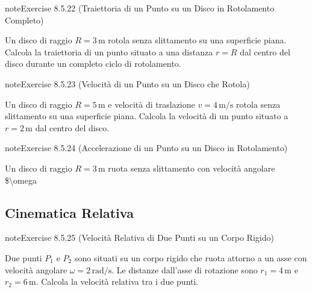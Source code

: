 \documentclass[letterpaper,10pt,italian]{jupyterBook}
\begin{document}
\begin{sphinxadmonition}{note}{Exercise 8.5.22 (Traiettoria di un Punto su un Disco in Rotolamento Completo)}



\sphinxAtStartPar
Un disco di raggio \(R = 3 \, \text{m}\) rotola senza slittamento su una superficie piana. Calcola la traiettoria di un punto situato a una distanza \(r = R\) dal centro del disco durante un completo ciclo di rotolamento.
\end{sphinxadmonition}
 \label{exercise:ch/mechanics/kinematics-problems-exercise-22}

\begin{sphinxadmonition}{note}{Exercise 8.5.23 (Velocità di un Punto su un Disco che Rotola)}



\sphinxAtStartPar
Un disco di raggio \(R = 5 \, \text{m}\) e velocità di traslazione \(v = 4 \, \text{m/s}\) rotola senza slittamento su una superficie piana. Calcola la velocità di un punto situato a \(r = 2 \, \text{m}\) dal centro del disco.
\end{sphinxadmonition}
 \label{exercise:ch/mechanics/kinematics-problems-exercise-23}

\begin{sphinxadmonition}{note}{Exercise 8.5.24 (Accelerazione di un Punto su un Disco in Rotolamento)}



\sphinxAtStartPar
Un disco di raggio \(R = 3 \, \text{m}\) ruota senza slittamento con velocità angolare \$\textbackslash{}omega
\end{sphinxadmonition}


\subsection{Cinematica Relativa}
\label{\detokenize{ch/mechanics/kinematics-problems:cinematica-relativa}} \label{exercise:ch/mechanics/kinematics-problems-exercise-24}

\begin{sphinxadmonition}{note}{Exercise 8.5.25 (Velocità Relativa di Due Punti su un Corpo Rigido)}



\sphinxAtStartPar
Due punti \(P_1\) e \(P_2\) sono situati su un corpo rigido che ruota attorno a un asse con velocità angolare \(\omega = 2 \, \text{rad/s}\). Le distanze dall’asse di rotazione sono \(r_1 = 4 \, \text{m}\) e \(r_2 = 6 \, \text{m}\). Calcola la velocità relativa tra i due punti.
\end{sphinxadmonition}
 \label{exercise:ch/mechanics/kinematics-problems-exercise-25}
\end{document}
